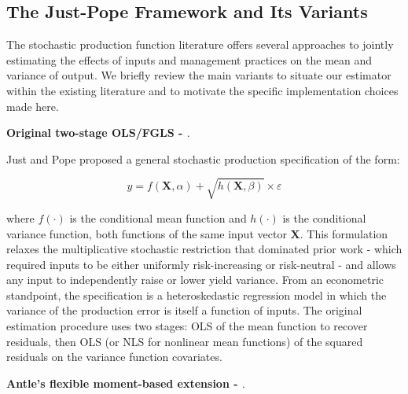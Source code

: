 \documentclass[12pt,letterpaper]{article}
\theoremstyle{remark}
\theoremstyle{remark}
\theoremstyle{plain}
\theoremstyle{definition}
\begin{document}
\subsection{\label{subsec:just_pope}The Just-Pope Framework and Its Variants}
The stochastic production function literature offers several approaches to jointly estimating the effects of inputs and management practices on the mean and variance of output. We briefly review the main variants to situate our estimator within the existing literature and to motivate the specific implementation choices made here.

\medskip\noindent\textbf{Original two-stage OLS/FGLS - \cite{Just1978, Just1979}}. 

Just and Pope proposed a general stochastic production specification of the form:

\begin{equation}
    y = f(\mathbf{X},\alpha)+\sqrt{h(\mathbf{X},\beta)}\times \varepsilon
\end{equation}

where $f(\cdot)$ is the conditional mean function and $h(\cdot)$ is the conditional variance function, both functions of the same input vector $\mathbf{X}$. This formulation relaxes the multiplicative stochastic restriction that dominated prior work - which
required inputs to be either uniformly risk-increasing or risk-neutral - and allows any input to independently raise or lower yield variance. From an econometric standpoint, the specification is a heteroskedastic regression model in which the variance of the production error is itself a function of inputs. The original estimation procedure uses two stages: OLS of the mean function to recover residuals, then OLS (or NLS for nonlinear mean functions) of the squared residuals on the variance function covariates.

\medskip\noindent\textbf{Antle's flexible moment-based extension - \cite{antle1983, Antle2010}}. 
\end{document}
